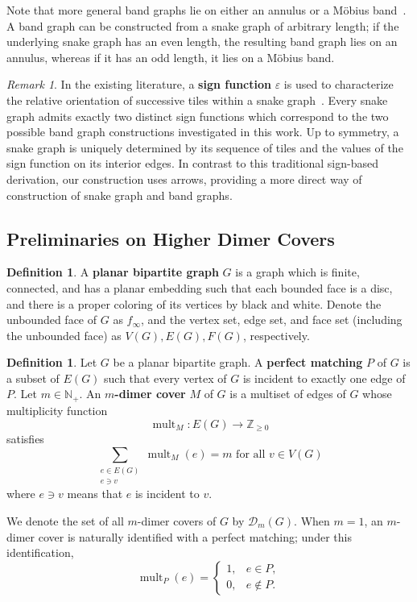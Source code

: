 \documentclass[11pt]{amsart}
\theoremstyle{definition}
\newtheorem{defn}[thm]{Definition}
\theoremstyle{remark}
\newtheorem{rem}[thm]{Remark}
\numberwithin{equation}{section}
\begin{document}
Note that more general band graphs lie on either an annulus or a M\"obius band~\cite{musiker2013bases}. A band graph can be constructed from a snake graph of arbitrary length; if the underlying snake graph has an even length, the resulting band graph lies on an annulus, whereas if it has an odd length, it lies on a M\"obius band.

\begin{rem}
    In the existing literature, a \textbf{sign function} $\varepsilon$ is used to characterize the relative orientation of successive tiles within a snake graph~\cite{CS20}. Every snake graph admits exactly two distinct sign functions which correspond to the two possible band graph constructions investigated in this work. Up to symmetry, a snake graph is uniquely determined by its sequence of tiles and the values of the sign function on its interior edges. In contrast to this traditional sign-based derivation, our construction uses arrows, providing a more direct way of construction of snake graph and band graphs.
\end{rem}


\subsection{Preliminaries on Higher Dimer Covers}\label{subsec: prelim_higher_dimer}

\begin{defn}
    A \textbf{planar bipartite graph} $G$ is a graph which is finite, connected, and has a planar embedding such that each bounded face is a disc, and there is a proper coloring of its vertices by black and white. Denote the unbounded face of $G$ as $f_{\infty}$, and the vertex set, edge set, and face set (including the unbounded face) as $V(G), E(G), F(G)$, respectively.
\end{defn}

\begin{defn}
Let $G$ be a planar bipartite graph. A \textbf{perfect matching} $P$ of $G$ is a subset of $E(G)$ such that every vertex of $G$ is incident to exactly one edge of $P$. Let $m\in\mathbb{N}_+$. An \textbf{$m$-dimer cover} $M$ of $G$
is a multiset of edges of $G$ whose multiplicity function
\[
    \operatorname{mult}_M:E(G)\longrightarrow\mathbb{Z}_{\geq 0}
\]
satisfies
\[
    \sum_{\substack{e\in E(G)\\e\ni v}}
    \operatorname{mult}_M(e)=m \text{ for all } v\in V(G)
\]
where $e\ni v$ means that $e$ is incident to $v$.

We denote the set of all $m$-dimer covers of $G$ by
$\mathcal{D}_m(G)$. When $m=1$, an $m$-dimer cover is naturally
identified with a perfect matching; under this identification,
\[
    \operatorname{mult}_P(e)=
    \begin{cases}
        1, & e\in P,\\
        0, & e\notin P.
    \end{cases}
\]
\end{defn}
\end{document}
